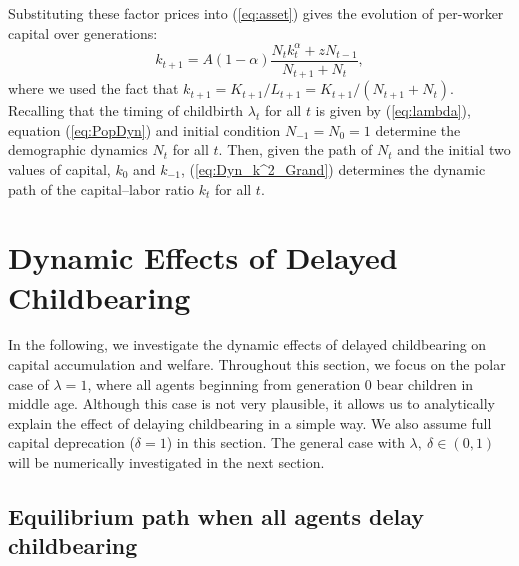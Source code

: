 \documentclass[nogrid]{MBE}%
\begin{document}
{Substituting these factor prices into (\ref{eq:asset}) gives the evolution of
per-worker capital over generations:
\begin{equation}
k_{t+1}=A\left(  1-\alpha\right)  \frac{N_{t}k_{t}^{\alpha}+zN_{t-1}  }{N_{t+1}+N_{t}}, \label{eq:Dyn_k^2_Grand}%
\end{equation}
where we used the fact that $k_{t+1}=K_{t+1}/L_{t+1}=K_{t+1}/(N_{t+1}+N_{t})$.
Recalling that the timing of childbirth $\lambda_{t}$ for all $t$ is given by
(\ref{eq:lambda}), equation (\ref{eq:PopDyn}) and initial condition
$N_{-1}=N_{0}=1$ determine the demographic dynamics $N_{t}$ for all $t$. Then,
given the path of $N_{t}$ and the initial two values of capital, $k_{0}$ and
$k_{-1}$, (\ref{eq:Dyn_k^2_Grand}) determines the dynamic path of the
capital--labor ratio $k_{t}$ for all $t$.

\section{Dynamic Effects of Delayed Childbearing\label{sec:Dyn}}

In the following, we investigate the dynamic effects of delayed childbearing
on capital accumulation and welfare. Throughout this section, we focus on the
polar case of $\lambda=1$, where all agents beginning from generation 0 bear
children in middle age. Although this case is not very plausible, it allows us
to analytically explain the effect of delaying childbearing in a simple way.
We also assume full capital deprecation ($\delta=1$) in this section. The
general case with $\lambda,\ \delta\in\left(  0,1\right)  $ will be
numerically investigated in the next section.

\subsection{ Equilibrium path when all agents delay childbearing
\label{subsec:Dyn_Property}}

}
\end{document}
